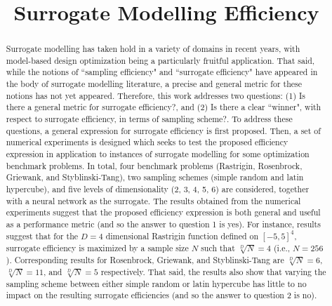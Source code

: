 \documentclass[conference]{IEEEtran}
\begin{document}

\title{Surrogate Modelling Efficiency}

\author{
}

\maketitle

\thispagestyle{plain}
\pagestyle{plain}



\begin{abstract}
Surrogate modelling has taken hold in a variety of domains in recent years, with model-based design optimization being a particularly fruitful application. That said, while the notions of ``sampling efficiency" and ``surrogate efficiency" have appeared in the body of surrogate modelling literature, a precise and general metric for these notions has not yet appeared. Therefore, this work addresses two questions: (1) Is there a general metric for surrogate efficiency?, and (2) Is there a clear ``winner", with respect to surrogate efficiency, in terms of sampling scheme?. To address these questions, a general expression for surrogate efficiency is first proposed. Then, a set of numerical experiments is designed which seeks to test the proposed efficiency expression in application to instances of surrogate modelling for some optimization benchmark problems. In total, four benchmark problems (Rastrigin, Rosenbrock, Griewank, and Styblinski-Tang), two sampling schemes (simple random and latin hypercube), and five levels of dimensionality (2, 3, 4, 5, 6) are considered, together with a neural network as the surrogate. The results obtained from the numerical experiments suggest that the proposed efficiency expression is both general and useful as a performance metric (and so the answer to question 1 is yes). For instance, results suggest that for the $D = 4$ dimensional Rastrigin function defined on $[-5, 5]^4$, surrogate efficiency is maximized by a sample size $N$ such that $\sqrt[D]{N} = 4$ (i.e., $N = 256$). Corresponding results for Rosenbrock, Griewank, and Styblinski-Tang are $\sqrt[D]{N} = 6$, $\sqrt[D]{N} = 11$, and $\sqrt[D]{N} = 5$ respectively. That said, the results also show that varying the sampling scheme between either simple random or latin hypercube has little to no impact on the resulting surrogate efficiencies (and so the answer to question 2 is no).
\end{abstract}
\end{document}

